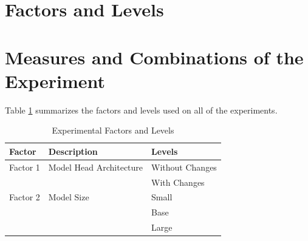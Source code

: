 
\section{Factors and Levels}
\label{sec:factors_and_levels}


\section{Measures and Combinations of the Experiment}

Table \ref{tab:factors_and_levels} summarizes the factors and levels used on all of the experiments. 


\begin{table}[H]
\centering
\caption{Experimental Factors and Levels}
\label{tab:factors_and_levels}
\begin{tabular}{lll}
\toprule
\textbf{Factor} & \textbf{Description} & \textbf{Levels} \\
\midrule
Factor 1 & Model Head Architecture 
         & Without Changes \\
         &                       
         & With Changes \\
\midrule
Factor 2 & Model Size             
         & Small \\
         &                       
         & Base \\
         &                       
         & Large \\
\bottomrule
\end{tabular}
\end{table}





